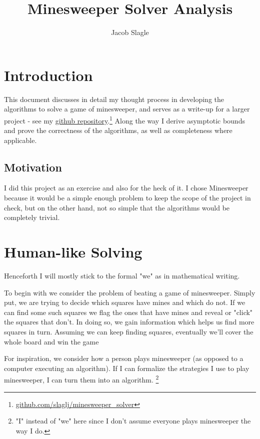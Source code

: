 \documentclass{article}
\title{Minesweeper Solver Analysis}
\author{Jacob Slagle}
\theoremstyle{definition}
\theoremstyle{definition}
\theoremstyle{theorem}
\begin{document}
	\date{}
	\maketitle
	
	\tableofcontents
	
	\section{Introduction}
	This document discusses in detail my thought process in developing the algorithms to solve a game of minesweeper, and serves as a write-up for a larger project - see my \href{https://github.com/slaglj/minesweeper_solver}{github repository}.\footnote{\url{github.com/slaglj/minesweeper_solver}} Along the way I derive asymptotic bounds and  prove the correctness of the algorithms, as well as completeness where applicable. 
	
	\subsection{Motivation}
	I did this project as an exercise and also for the heck of it. I chose Minesweeper because it would be a simple enough problem to keep the scope of the project in check, but on the other hand, not so simple that the algorithms would be completely trivial. 
	\section{Human-like Solving}
	Henceforth I will mostly stick to the formal "we" as in mathematical writing.
	
	To begin with we consider the problem of beating a game of minesweeper. Simply put, we are trying to decide which squares have mines and which do not. If we can find some such squares we flag the ones that have mines and reveal or "click" the squares that don't. In doing so, we gain information which helps us find more squares in turn. Assuming we can keep finding squares, eventually we'll cover the whole board and win the game
	
	For inspiration, we consider how a person plays minesweeper (as opposed to a computer executing an algorithm). If I can formalize the strategies I use to play minesweeper, I can turn them into an algorithm. \footnote{"I" instead of "we" here since I don't assume everyone plays minesweeper the way I do.}
	
\end{document}
